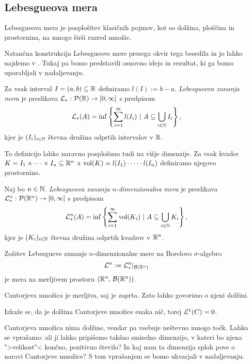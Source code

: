 \subsection{Lebesgueova mera}
Lebesgueova mera je posplošitev klasičnih pojmov, kot so dolžina, ploščina in prostornina, na mnogo širši razred množic. 

Natančna konstrukcija Lebesgueove mere presega okvir tega besedila in jo lahko najdemo v \cite[poglavje 1]{mb-otm}. Tukaj pa bomo predstavili osnovno idejo in rezultat, ki ga bomo uporabljali v nadaljevanju.

\begin{definicija}
    Za vsak interval \(I = (a, b) \subseteq \mathbb{R}\) definiramo \(l(I) := b -a\). \emph{Lebesgueova zunanja mera} je preslikava \(\mathcal{L}_*: \mathcal{P}(\mathbb{R}) \to [0, \infty]\) s predpisom 
    \[\mathcal{L}_*(A) = \inf \left\{\sum_{i=1}^{\infty} l(I_i) \ | \ A \subseteq \bigcup_{i \in \mathbb{N}} I_i\right\},\]
    kjer je \((I_i)_{i \in \mathbb{N}}\) števna družina odprtih intervalov v \(\mathbb{R}\).
\end{definicija}

To definicijo lahko naravno posplošimo tudi na višje dimenzije. Za vsak kvader \(K = I_1 \times \cdots \times I_n \subseteq \mathbb{R}^n\) z \(\operatorname{vol}(K) = l(I_1) \cdot \cdots \cdot l(I_n)\) definiramo njegovo prostornino.

\begin{definicija}
    Naj bo \(n \in \mathbb{N}\). \emph{Lebesgueova zunanja \(n\)-dimenzionalna mera} je preslikava \(\mathcal{L}_*^n: \mathcal{P}(\mathbb{R}^n) \to [0, \infty]\) s predpisom 
    \[\mathcal{L}_*^n(A) = \inf \left\{\sum_{i=1}^{\infty} \operatorname{vol}(K_i) \ | \ A \subseteq \bigcup_{i \in \mathbb{N}} K_i\right\},\]
    kjer je \((K_i)_{i \in \mathbb{N}}\) števna družina odprtih kvadrov v \(\mathbb{R}^n\).
\end{definicija}

\begin{trditev}
    Zožitev Lebesgueve zunanje \(n\)-dimenzionalne mere na Borelovo \(\sigma\)-algebro
    \[\mathcal{L}^n := \mathcal{L}_*^n|_{\mathcal{B}(\mathbb{R}^n)}\] je mera na merljivem prostoru \((\mathbb{R}^n,\, \mathcal{B}(\mathbb{R}^n))\).
\end{trditev}

\begin{zgled}
    Cantorjeva množica je merljiva, saj je zaprta. Zato lahko govorimo o njeni dolžini.

    Izkaže se, da je dolžina Cantorjeve množice enaka nič, torej \(\mathcal{L}^1(C) = 0\).
\end{zgled}

Cantorjeva množica nima dolžine, vendar pa vsebuje neštevno mnogo točk. Lahko se vprašamo: ali ji lahko pripišemo takšno smiselno dimenzijo, v kateri bo njena ">velikost"< končno, pozitivno število? In kaj nam ta dimenzija sploh pove o naravi Cantorjeve množice? S tem vprašanjem se bomo ukvarjali v nadaljevanju.